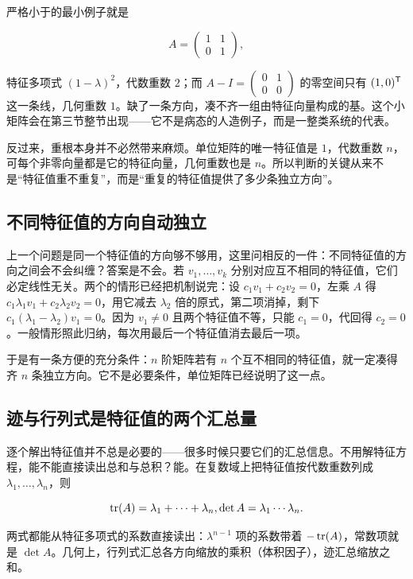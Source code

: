 严格小于的最小例子就是

\[
A=\begin{pmatrix}1&1\\0&1\end{pmatrix},
\]

特征多项式 \((1-\lambda)^2\)，代数重数 \(2\)；而 \(A-I=\begin{pmatrix}0&1\\0&0\end{pmatrix}\) 的零空间只有 \((1,0)^{\mathsf{T}}\) 这一条线，几何重数 \(1\)。缺了一条方向，凑不齐一组由特征向量构成的基。这个小矩阵会在第三节整节出现——它不是病态的人造例子，而是一整类系统的代表。

反过来，重根本身并不必然带来麻烦。单位矩阵的唯一特征值是 \(1\)，代数重数 \(n\)，可每个非零向量都是它的特征向量，几何重数也是 \(n\)。所以判断的关键从来不是``特征值重不重复''，而是``重复的特征值提供了多少条独立方向''。

\subsection{不同特征值的方向自动独立}

上一个问题是同一个特征值的方向够不够用，这里问相反的一件：不同特征值的方向之间会不会纠缠？答案是不会。若 \(v_1,\dots,v_k\) 分别对应互不相同的特征值，它们必定线性无关。两个的情形已经把机制说完：设 \(c_1v_1+c_2v_2=0\)，左乘 \(A\) 得 \(c_1\lambda_1v_1+c_2\lambda_2v_2=0\)，用它减去 \(\lambda_2\) 倍的原式，第二项消掉，剩下 \(c_1(\lambda_1-\lambda_2)v_1=0\)。因为 \(v_1\neq 0\) 且两个特征值不等，只能 \(c_1=0\)，代回得 \(c_2=0\)。一般情形照此归纳，每次用最后一个特征值消去最后一项。

于是有一条方便的充分条件：\(n\) 阶矩阵若有 \(n\) 个互不相同的特征值，就一定凑得齐 \(n\) 条独立方向。它不是必要条件，单位矩阵已经说明了这一点。

\subsection{迹与行列式是特征值的两个汇总量}

逐个解出特征值并不总是必要的——很多时候只要它们的汇总信息。不用解特征方程，能不能直接读出总和与总积？能。在复数域上把特征值按代数重数列成 \(\lambda_1,\dots,\lambda_n\)，则

\[
\operatorname{tr}(A)=\lambda_1+\cdots+\lambda_n,
\space
\det A=\lambda_1\cdots\lambda_n .
\]

两式都能从特征多项式的系数直接读出：\(\lambda^{n-1}\) 项的系数带着 \(-\operatorname{tr}(A)\)，常数项就是 \(\det A\)。几何上，行列式汇总各方向缩放的乘积（体积因子），迹汇总缩放之和。

